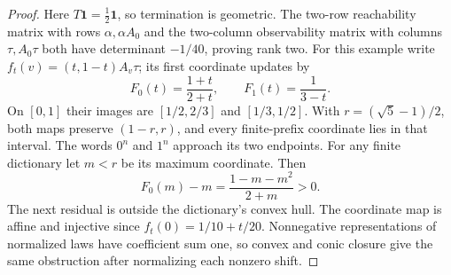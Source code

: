 \begin{proof}
Here $T\mathbf1=\frac12\mathbf1$, so termination is geometric.
The two-row reachability matrix with rows $\alpha,\alpha A_0$
and the two-column observability matrix with columns $\tau,A_0\tau$
both have determinant $-1/40$, proving rank two.
For this example write $f_t(v)=(t,1-t)A_v\tau$; its first coordinate
updates by
\[
 F_0(t)=\frac{1+t}{2+t},\qquad F_1(t)=\frac1{3-t}.
\]
On $[0,1]$ their images are $[1/2,2/3]$ and $[1/3,1/2]$.
With $r=(\sqrt5-1)/2$, both maps preserve $(1-r,r)$, and every
finite-prefix coordinate lies in that interval. The words $0^n$
and $1^n$ approach its two endpoints. For any finite dictionary let
$m<r$ be its maximum coordinate. Then
\[
 F_0(m)-m=\frac{1-m-m^2}{2+m}>0.
\]
The next residual is outside the dictionary's convex hull. The
coordinate map is affine and injective since
$f_t(0)=1/10+t/20$. Nonnegative representations of normalized laws
have coefficient sum one, so convex and conic closure give the same
obstruction after normalizing each nonzero shift.
\end{proof}

